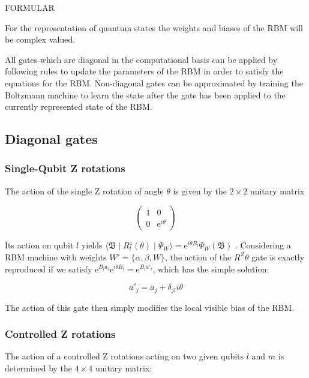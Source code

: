 FORMULAR

For the representation of quantum states the weights and biases of the RBM will be complex valued.

All gates which are diagonal in the computational basis can be applied by following rules to update the parameters of the RBM
in order to satisfy the equations for the RBM. Non-diagonal gates can be approximated by training the Boltzmann machine to 
learn the state after the gate has been applied to the currently represented state of the RBM.

\subsection{Diagonal gates}
\subsubsection{Single-Qubit Z rotations}
The action of the single Z rotation of angle $\theta$ is given by the $2\times2$ unitary matrix

\begin{equation}
    \begin{pmatrix}
        1 & 0 \\
        0 & \mathrm{e}^{i\theta}
    \end{pmatrix}
\end{equation}

Its action on qubit $l$ yields 
$\langle \mathfrak{B} \mid R_{l}^{z}(\theta) \mid \Psi_{W}  \rangle = 
\mathrm{e}^{i\theta B_{l}} \Psi_{W}(\mathfrak{B})
$
. Considering a RBM machine with weights $W\prime = \{\alpha,\beta,W\}$, the action of the $R^{Z}{\theta}$
gate is exactly reproduced if we satisfy $\mathrm{e}^{B_{l}a_{l}}\mathrm{e}^{i\theta B_{l}} = \mathrm{e}^{B_{l}a\prime_{l}}$,
which has the simple solution:

\begin{equation}
    a\prime_{j} = a_{j} + \delta_{jl}i\theta
\end{equation}

The action of this gate then simply modifies the local visible bias of the RBM.

\subsubsection{Controlled Z rotations}
The action of a controlled Z rotations acting on two given qubits $l$ and $m$ is determined by
the $4\times4$ unitary matrix:

